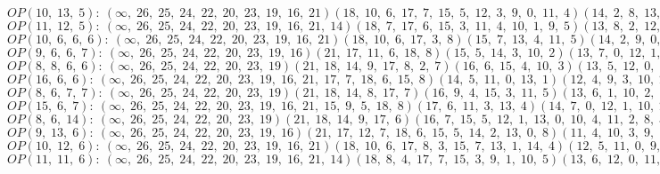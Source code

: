 $OP(10, \;13, \;5): \:(\infty, \;26, \;25, \;24, \;22, \;20, \;23, \;19, \;16, \;21)(18, \;10, \;6, \;17, \;7, \;15, \;5, \;12, \;3, \;9, \;0, \;11, \;4)(14, \;2, \;8, \;13, \;1)$\\
$OP(11, \;12, \;5): \:(\infty, \;26, \;25, \;24, \;22, \;20, \;23, \;19, \;16, \;21, \;14)(18, \;7, \;17, \;6, \;15, \;3, \;11, \;4, \;10, \;1, \;9, \;5)(13, \;8, \;2, \;12, \;0)$\\
$OP(10, \;6, \;6, \;6): \:(\infty, \;26, \;25, \;24, \;22, \;20, \;23, \;19, \;16, \;21)(18, \;10, \;6, \;17, \;3, \;8)(15, \;7, \;13, \;4, \;11, \;5)(14, \;2, \;9, \;0, \;12, \;1)$\\
$OP(9, \;6, \;6, \;7): \:(\infty, \;26, \;25, \;24, \;22, \;20, \;23, \;19, \;16)(21, \;17, \;11, \;6, \;18, \;8)(15, \;5, \;14, \;3, \;10, \;2)(13, \;7, \;0, \;12, \;1, \;9, \;4)$\\
$OP(8, \;8, \;6, \;6): \:(\infty, \;26, \;25, \;24, \;22, \;20, \;23, \;19)(21, \;18, \;14, \;9, \;17, \;8, \;2, \;7)(16, \;6, \;15, \;4, \;10, \;3)(13, \;5, \;12, \;0, \;11, \;1)$\\
$OP(16, \;6, \;6): \:(\infty, \;26, \;25, \;24, \;22, \;20, \;23, \;19, \;16, \;21, \;17, \;7, \;18, \;6, \;15, \;8)(14, \;5, \;11, \;0, \;13, \;1)(12, \;4, \;9, \;3, \;10, \;2)$\\
$OP(8, \;6, \;7, \;7): \:(\infty, \;26, \;25, \;24, \;22, \;20, \;23, \;19)(21, \;18, \;14, \;8, \;17, \;7)(16, \;9, \;4, \;15, \;3, \;11, \;5)(13, \;6, \;1, \;10, \;2, \;12, \;0)$\\
$OP(15, \;6, \;7): \:(\infty, \;26, \;25, \;24, \;22, \;20, \;23, \;19, \;16, \;21, \;15, \;9, \;5, \;18, \;8)(17, \;6, \;11, \;3, \;13, \;4)(14, \;7, \;0, \;12, \;1, \;10, \;2)$\\
$OP(8, \;6, \;14): \:(\infty, \;26, \;25, \;24, \;22, \;20, \;23, \;19)(21, \;18, \;14, \;9, \;17, \;6)(16, \;7, \;15, \;5, \;12, \;1, \;13, \;0, \;10, \;4, \;11, \;2, \;8, \;3)$\\
$OP(9, \;13, \;6): \:(\infty, \;26, \;25, \;24, \;22, \;20, \;23, \;19, \;16)(21, \;17, \;12, \;7, \;18, \;6, \;15, \;5, \;14, \;2, \;13, \;0, \;8)(11, \;4, \;10, \;3, \;9, \;1)$\\
$OP(10, \;12, \;6): \:(\infty, \;26, \;25, \;24, \;22, \;20, \;23, \;19, \;16, \;21)(18, \;10, \;6, \;17, \;8, \;3, \;15, \;7, \;13, \;1, \;14, \;4)(12, \;5, \;11, \;0, \;9, \;2)$\\
$OP(11, \;11, \;6): \:(\infty, \;26, \;25, \;24, \;22, \;20, \;23, \;19, \;16, \;21, \;14)(18, \;8, \;4, \;17, \;7, \;15, \;3, \;9, \;1, \;10, \;5)(13, \;6, \;12, \;0, \;11, \;2)$\\
